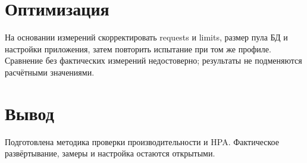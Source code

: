 \documentclass[14pt,a4paper]{extarticle}
\begin{document}
\section{Оптимизация}
На основании измерений скорректировать requests и limits, размер пула БД и настройки приложения, затем повторить испытание при том же профиле. Сравнение без фактических измерений недостоверно; результаты не подменяются расчётными значениями.
\section{Вывод}
Подготовлена методика проверки производительности и HPA. Фактическое развёртывание, замеры и настройка остаются открытыми.
\end{document}
